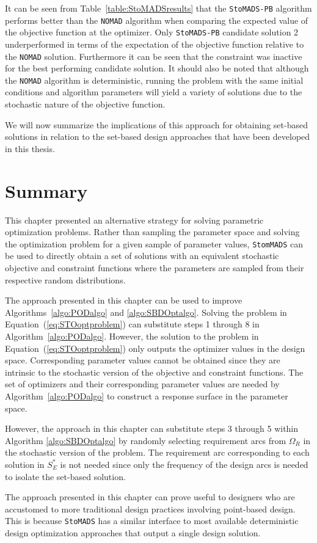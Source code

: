 It can be seen from Table~\ref{table:StoMADSresults} that the \texttt{StoMADS-PB} algorithm performs better than the \texttt{NOMAD} algorithm when comparing the expected value of the objective function at the optimizer. Only \texttt{StoMADS-PB} candidate solution 2 underperformed in terms of the expectation of the objective function relative to the \texttt{NOMAD} solution. Furthermore it can be seen that the constraint was inactive for the best performing candidate solution. It should also be noted that although the \texttt{NOMAD} algorithm is deterministic, running the problem with the same initial conditions and algorithm parameters will yield a variety of solutions due to the stochastic nature of the objective function.

We will now summarize the implications of this approach for obtaining set-based solutions in relation to the set-based design approaches that have been developed in this thesis.

\section{Summary}
\label{sec:stohasticoptsummary}

This chapter presented an alternative strategy for solving parametric optimization problems. Rather than sampling the parameter space and solving the optimization problem for a given sample of parameter values, \texttt{StomMADS} can be used to directly obtain a set of solutions with an equivalent stochastic objective and constraint functions where the parameters are sampled from their respective random distributions.

The approach presented in this chapter can be used to improve Algorithms~\ref{algo:PODalgo} and \ref{algo:SBDOptalgo}. Solving the problem in Equation~(\ref{eq:STOoptproblem}) can substitute steps 1 through 8 in Algorithm~\ref{algo:PODalgo}. However, the solution to the problem in Equation~(\ref{eq:STOoptproblem}) only outputs the optimizer values in the design space. Corresponding parameter values cannot be obtained since they are intrinsic to the stochastic version of the objective and constraint functions. The set of optimizers and their corresponding parameter values are needed by Algorithm~\ref{algo:PODalgo} to construct a response surface in the parameter space.

However, the approach in this chapter can substitute steps 3 through 5 within Algorithm \ref{algo:SBDOptalgo} by randomly selecting requirement arcs from $\Omega_R$ in the stochastic version of the problem. The requirement arc corresponding to each solution in $S_{E}^*$ is not needed since only the frequency of the design arcs is needed to isolate the set-based solution.

The approach presented in this chapter can prove useful to designers who are accustomed to more traditional design practices involving point-based design. This is because \texttt{StoMADS} has a similar interface to most available deterministic design optimization approaches that output a single design solution.